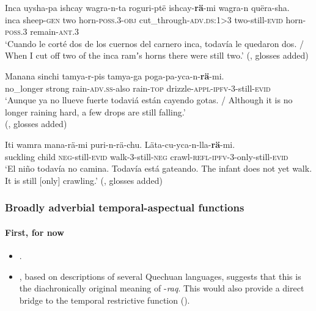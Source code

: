 \begin{exe}
	\ex\label{exAppendixQuechuaScalar1}
	\gll Inca	uysha-pa	ishcay	wagra-n-ta		roguri-ptë ishcay-\textbf{rä}-mi 	wagra-n 	quëra-sha.\\
	inca sheep-\textsc{gen} two horn-\textsc{poss}.3-\textsc{obj} cut\_through-\textsc{adv}.\textsc{ds}:1>3 two-still-\textsc{evid} horn-\textsc{poss}.3 remain-\textsc{ant}.3\\
	\glt \lq Cuando le corté dos de los cuernos del carnero inca, todavía le quedaron dos. /
When I cut off two of the inca ramʼs horns there were still two.\rq{ }(\cite[252]{WeberEtAl2008}, glosses added)

	\ex\label{exAppendixQuechuaScalar2}
	\gll Manana sinchi	tamya-r-pis tamya-ga	poga-pa-yca-n-\textbf{rä}-mi.\\
	no\_longer strong rain-\textsc{adv}.\textsc{ss}-also rain-\textsc{top} drizzle-\textsc{appl}-\textsc{ipfv}-3-still-\textsc{evid}\\
	\glt \lq Aunque ya no llueve fuerte todaviá están cayendo gotas. / Although it is no longer raining hard, a few drops are still falling.\rq{ 
	\\}(\cite[420]{WeberEtAl2008}, glosses added)
	
	\ex\label{exAppendixQuechuaScalar3}
	\gll Iti wamra mana-rä-mi puri-n-rä-chu. Läta-cu-yca-n-lla-\textbf{rä}-mi.\\
	suckling child \textsc{neg}-still-\textsc{evid} walk-3-still-\textsc{neg} crawl-\textsc{refl}-\textsc{ipfv}-3-only-still-\textsc{evid}\\
	\glt \lq El niño todavía no camina. Todavía está gateando. The infant does not yet walk. It is still [only] crawling.\rq{ }(\cite[298]{WeberEtAl2008}, glosses added)
\end{exe}


\subsubsection{Broadly adverbial temporal-aspectual functions}
\paragraph{First, for now}
\label{appendixQuechuaFirstMain}
\begin{itemize}
	\item \textcite[388]{Weber1989}.
	\item \Textcite[90–91]{vanBaar1997}, based on descriptions of several Quechuan languages, suggests that this is the  diachronically original meaning of \mbox{-\textit{raq}}. This would also provide a direct bridge to the temporal restrictive function ().
\end{itemize}

